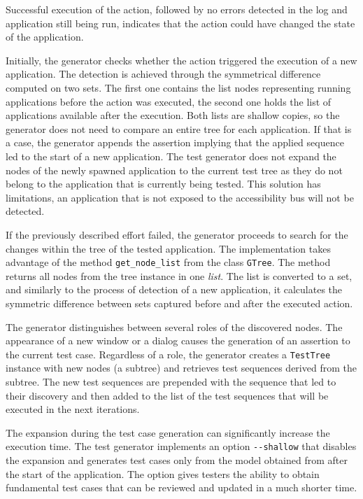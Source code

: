 Successful execution of the action, followed by no errors detected in the log and application still being run, indicates that the action could have changed the state of the application. 

Initially, the generator checks whether the action triggered the execution of a new application. The detection is achieved through the symmetrical difference computed on two sets. The first one contains the list nodes representing running applications before the action was executed, the second one holds the list of applications available after the execution. Both lists are shallow copies, so the generator does not need to compare an entire tree for each application. If that is a case, the generator appends the assertion implying that the applied sequence led to the start of a new application. The test generator does not expand the nodes of the newly spawned application to the current test tree as they do not belong to the application that is currently being tested. This solution has limitations, an application that is not exposed to the accessibility bus will not be detected.

If the previously described effort failed, the generator proceeds to search for the changes within the tree of the tested application. The implementation takes advantage of the method \texttt{get\_node\_list} from the class \texttt{GTree}. The method returns all nodes from the tree instance in one \textit{list}. The list is converted to a set, and similarly to the process of detection of a new application, it calculates the symmetric difference between sets captured before and after the executed action. 

The generator distinguishes between several roles of the discovered nodes. The appearance of a new window or a dialog causes the generation of an assertion to the current test case. Regardless of a role, the generator creates a \texttt{TestTree} instance with new nodes (a subtree) and retrieves test sequences derived from the subtree. The new test sequences are prepended with the sequence that led to their discovery and then added to the list of the test sequences that will be executed in the next iterations.

The expansion during the test case generation can significantly increase the execution time. The test generator implements an option \texttt{{-}{-}shallow} that disables the expansion and generates test cases only from the model obtained from after the start of the application. The option gives testers the ability to obtain fundamental test cases that can be reviewed and updated in a much shorter time.

